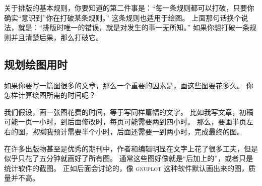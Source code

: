 关于排版的基本规则，你要知道的第二件事是：“每一条规则都可以打破，只要你确实“意识到”你在打破某条规则。”
这条规则也适用于绘图。
上面那句话换个说法，就是：“排版时唯一的错误，就是对发生的事一无所知。”
如果你想打破一条规则并且清楚后果，那么打破它。

\eohs


\subsection{规划绘图用时}

\bohs

如果你要写一篇图很多的文章，那么一个重要的因素是，画这些图要花多久。
你怎样计算绘图所需的时间呢？

我们假设，画一张图花费的时间，等于写同样篇幅的文字。
比如我写文章，初稿可能一页一小时，到后面修改时，每页可能需要两到四小时。
那么，要画半页左右的图，\emph{初稿}我预计需要半个小时，后面还需要一到两小时，完成最终的图。

在许多出版物甚至是优秀的期刊中，作者和编辑明显在文字上花了很多工夫，但是似乎只花了五分钟就画好了所有图。
通常这些图好像就是“后加上的”，或者只是统计软件的截图。
正如后面会讨论的，像 \textsc{gnuplot} 这种软件默认画出来的图，质量并不高。


